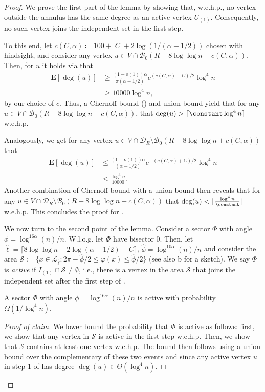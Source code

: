 \documentclass[letterpaper,11pt]{article}
\newcommand{\E}[1]{\mathbf{E}\left[#1\right]}
\newcommand{\wehp}{w.e.h.p.\xspace}
\newcommand{\B}{\mathcal B}
\newcommand{\1}{\mathbb I}
\newcommand{\Layer}[1]{\mathcal{L}_{#1}}
\begin{document}
\begin{proof} 
 We prove the first part of the lemma by showing that, \wehp, no vertex outside the annulus has the same degree as an active vertex $U_{(1)}$. Consequently, no such vertex joins the independent set in the first step.
    
    To this end, let $c(C, \alpha) \coloneqq 100 + |C| + 2\log(1/(\alpha - 1/2))$ chosen with hindsight, and consider any vertex $u \in V \cap \B_0(R - {8\log\log n} - c(C, \alpha))$. Then, for $u$ it holds via  that 
    \begin{align*}
        \E{\deg(u)} 
        &\geq \frac{(1-o(1))\alpha}{\pi(\alpha - 1/2)} e^{(c(C, \alpha) - C)/2} \log^{4}n\\
        &\geq 10000 \log^{4}n,
    \end{align*}
    by our choice of $c$. Thus, a Chernoff-bound () and union bound yield that for any $u \in V \cap \B_0(R - {8\log\log n} - c(C, \alpha))$, that $\deg(u) > \lceil\constant \log^{4} n \rceil$ w.e.h.p.
    
    Analogously, we get for any vertex $u \in V \cap \mathcal{D}_R \setminus \B_0(R - {8\log\log n} + c(C, \alpha))$ that 
     \begin{align*}
        \E{\deg(u)} 
        & \leq \frac{(1+o(1))\alpha}{(\alpha - 1/2)} e^{-(c(C, \alpha) + C)/2} \log^{4}n\\
        & \leq \frac{\log^{4} n}{10000} .
    \end{align*}
    Another combination of Chernoff bound with a union bound then reveals that for any $u \in V \cap \mathcal{D}_R \setminus \B_0(R - {8\log\log n} + c(C, \alpha))$ that $\deg(u) < \lfloor\frac{\log^{4} n}{\constant}\rfloor$ \wehp This concludes the proof for .
    
    We now turn to the second point of the lemma. Consider a sector $\Phi$ with angle $\phi = \log ^{16\alpha }(n) /n $. W.l.o.g. let $\Phi$ have bisector $0$. Then, let $\hat{\ell} = \lceil 8\log\log n + 2\log(\alpha - 1/2) - C \rceil$, $\hat{\phi} = \log^{10\alpha}(n)/n$ and consider the area $\mathcal{S} := \{x \in \Layer{\hat{\ell}} : 2\pi - \hat{\phi} /2 \leq \varphi(x) \leq \hat{\phi}/2 \}$ (see also b for a sketch). We say $\Phi$ is \emph{active} if $I_{(1)} \cap \mathcal{S} \neq \emptyset$, i.e., there is a vertex in the area $\mathcal{S}$ that joins the independent set after the first step of \algo.
%
\begin{claim}\label{claim:active-sector}
    A sector $\Phi$ with angle $\phi = \log ^{16\alpha }(n) /n $ is active with probability $\Omega(1/\log^{4} n)$.
\end{claim}
%
{
\renewcommand{\qedsymbol}{$\blacksquare$} %
\begin{proof}[Proof of claim]
    We lower bound the probability that $\Phi$ is active as follows: first, we show that any vertex in $\mathcal{S}$ is active in the first step \wehp Then, we show that $\mathcal{S}$ contains at least one vertex \wehp The bound then follows using a union bound over the complementary of these two events and since any active vertex $u$ in step 1 of \algo has degree $\deg(u) \in \Theta(\log^{4} n)$.


\end{proof}}
\end{proof}
\end{document}

